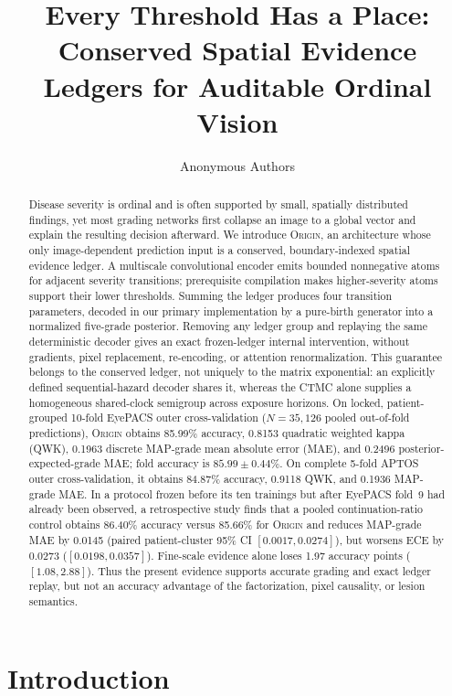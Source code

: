 \documentclass[10pt,twocolumn,letterpaper]{article}
\title{Every Threshold Has a Place: Conserved Spatial Evidence\\
Ledgers for Auditable Ordinal Vision}
\author{Anonymous Authors}
\newcommand{\method}{\textsc{Origin}\xspace}
\begin{document}
\maketitle

\begin{abstract}
Disease severity is ordinal and is often supported by small, spatially
distributed findings, yet most grading networks first collapse an image to a
global vector and explain the resulting decision afterward.  We introduce
\method, an architecture whose only image-dependent prediction input is a
conserved, boundary-indexed spatial evidence ledger.  A multiscale
convolutional encoder emits bounded nonnegative atoms for adjacent severity
transitions; prerequisite compilation makes higher-severity atoms support
their lower thresholds.  Summing the ledger produces four transition
parameters, decoded in our primary implementation by a pure-birth generator
into a normalized five-grade posterior.  Removing any ledger group and
replaying the same deterministic decoder gives an exact frozen-ledger internal
intervention, without gradients, pixel replacement, re-encoding, or attention
renormalization.  This guarantee belongs to the conserved ledger, not uniquely
to the matrix exponential: an explicitly defined sequential-hazard decoder
shares it, whereas the CTMC alone supplies a homogeneous shared-clock semigroup
across exposure horizons.  On locked, patient-grouped 10-fold EyePACS outer
cross-validation ($N=35{,}126$ pooled out-of-fold predictions), \method obtains
85.99\% accuracy, 0.8153 quadratic weighted kappa (QWK), 0.1963 discrete
MAP-grade mean absolute error (MAE), and 0.2496 posterior-expected-grade MAE;
fold accuracy is
$85.99\!\pm\!0.44$\%.  On complete 5-fold APTOS outer cross-validation, it
obtains 84.87\% accuracy, 0.9118 QWK, and 0.1936 MAP-grade MAE.
In a protocol frozen before its ten trainings but after EyePACS fold~9 had
already been observed, a retrospective study finds that a pooled continuation-ratio
control obtains 86.40\% accuracy
versus 85.66\% for \method and reduces MAP-grade MAE by 0.0145 (paired
patient-cluster 95\% CI $[0.0017,0.0274]$), but worsens ECE by 0.0273
($[0.0198,0.0357]$).  Fine-scale evidence alone loses 1.97 accuracy points
($[1.08,2.88]$).  Thus the present evidence supports accurate grading and
exact ledger replay, but not an accuracy advantage of the factorization,
pixel causality, or lesion semantics.
\end{abstract}

\section{Introduction}
\label{sec:intro}
\end{document}
